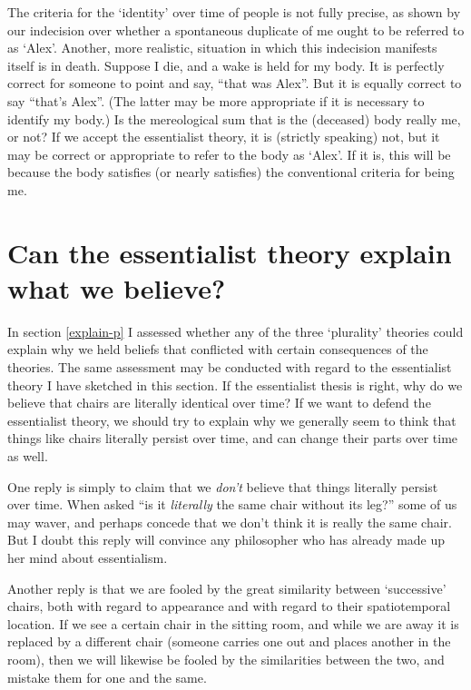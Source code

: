\documentclass[11pt]{article}
\begin{document}
\begin{spacing}{1.5}
The criteria for the `identity' over time of people is not fully
precise, as shown by our indecision over whether a spontaneous
duplicate of me ought to be referred to as `Alex'.  Another, more
realistic, situation in which this indecision manifests itself is in
death.  Suppose I die, and a wake is held for my body.  It is
perfectly correct for someone to point and say, ``that was Alex''.
But it is equally correct to say ``that's Alex''.  (The latter may be
more appropriate if it is necessary to identify my body.)  Is the
mereological sum that is the (deceased) body really me, or not?  If we
accept the essentialist theory, it is (strictly speaking) not, but it
may be correct or appropriate to refer to the body as `Alex'.  If it
is, this will be because the body satisfies (or nearly satisfies) the
conventional criteria for being me.

\section{Can the essentialist theory explain what we believe?}
\label{explain-e}
In section \ref{explain-p} I assessed whether any of the three
`plurality' theories could explain why we held beliefs that conflicted
with certain consequences of the theories.  The same assessment may
be conducted with regard to the essentialist theory I have sketched in
this section.  If the essentialist thesis is right, why do we believe
that chairs are literally identical over time?  If we want to defend
the essentialist theory, we should try to explain why we generally
seem to think that things like chairs literally persist over time, and
can change their parts over time as well.

One reply is simply to claim that we {\em don't} believe that things
literally persist over time.  When asked ``is it {\em literally} the
same chair without its leg?'' some of us may waver, and perhaps
concede that we don't think it is really the same chair.  But I doubt
this reply will convince any philosopher who has already made up her
mind about essentialism.

Another reply is that we are fooled by the great similarity between
`successive' chairs, both with regard to appearance and with regard to
their spatiotemporal location.  If we see a certain chair in the
sitting room, and while we are away it is replaced by a different
chair (someone carries one out and places another in the room), then
we will likewise be fooled by the similarities between the two, and
mistake them for one and the same.


\end{spacing}
\end{document}
